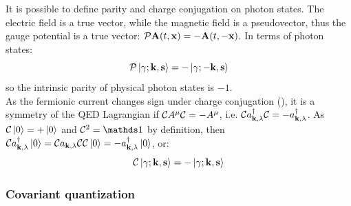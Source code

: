 It is possible to define parity and charge conjugation on photon states. The electric field is a true vector, while the magnetic field is a pseudovector, thus the gauge potential is a true vector: $ \mathcal{P} \mathbf{A}(t,\mathbf{x}) = - \mathbf{A}(t,-\mathbf{x}) $. In terms of photon states:
\begin{equation}
  \mathcal{P} \ket{\gamma ; \mathbf{k}, \mathbf{s}} = - \ket{\gamma ; -\mathbf{k}, \mathbf{s}}
\end{equation}
so the intrinsic parity of physical photon states is $ -1 $. \\
As the fermionic current changes sign under charge conjugation (), it is a symmetry of the QED Lagrangian if $ \mathcal{C} A^\mu \mathcal{C} = - A^\mu $, i.e. $ \mathcal{C} a_{\mathbf{k},\lambda}^\dagger \mathcal{C} = - a_{\mathbf{k},\lambda}^\dagger $. As $ \mathcal{C} \ket{0} = +\ket{0} $ and $ \chargec^2 = \id $ by definition, then $ \mathcal{C} a_{\mathbf{k},\lambda}^\dagger \ket{0} = \mathcal{C} a_{\mathbf{k},\lambda} \mathcal{C} \mathcal{C} \ket{0} = - a_{\mathbf{k},\lambda}^\dagger \ket{0} $, or:
\begin{equation}
  \mathcal{C} \ket{\gamma ; \mathbf{k} , \mathbf{s}} = - \ket{\gamma ; \mathbf{k} , \mathbf{s}}
\end{equation}

\subsubsection{Covariant quantization}

